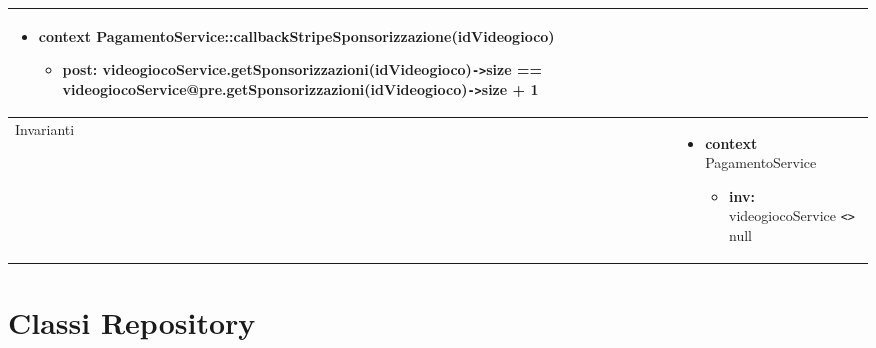 \begin{tabular}{|| l | p{28em} ||}
\begin{itemize}[leftmargin=*]
		\item \textbf{context} PagamentoService::\newline callbackStripeSponsorizzazione(idVideogioco)
		\begin{itemize}
			\item[ ] \textbf{post:} videogiocoService\newline .getSponsorizzazioni(idVideogioco)\verb|->|size == videogiocoService\newline @pre.getSponsorizzazioni(idVideogioco)\verb|->|size + 1
		\end{itemize}
	\end{itemize}\\
	\hline
	Invarianti & \begin{itemize}
		\item \textbf{context} PagamentoService
		\begin{itemize}
			\item[ ] \textbf{inv:} videogiocoService \verb|<>| null
		\end{itemize}
	\end{itemize}\\
	\hline
\end{tabular}


\newpage
\section{Classi Repository}
